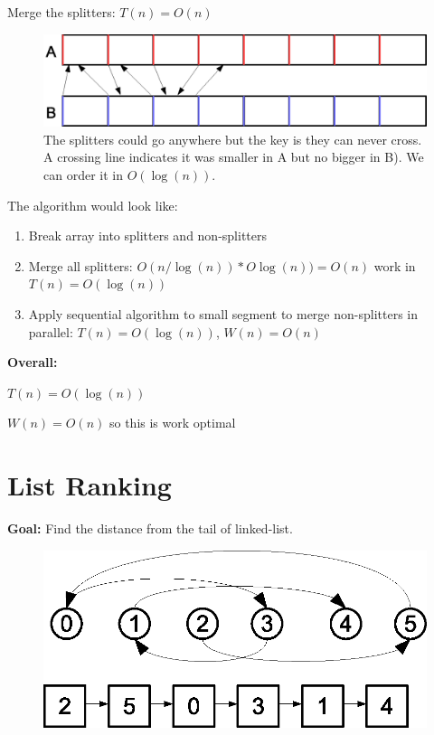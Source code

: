 \documentclass[twoside]{article}
\begin{document}
Merge the splitters: $T(n)=O(n)$
\begin{figure}[H]
\center
\includegraphics[scale=0.5]{img/merge.eps}
\caption{The splitters could go anywhere but the key is they can never cross. A crossing line indicates it was smaller in A but no bigger in B). We can order it in $O(\log(n))$.}
\end{figure}

The algorithm would look like:
\begin{enumerate}
    \item Break array into splitters and non-splitters
    \item Merge all splitters: $O(n/\log(n)) * O\log(n)) = O(n)$ work in $T(n) = O(\log(n))$
    \item Apply sequential algorithm to small segment to merge non-splitters in parallel: $T(n) = O(\log(n))$, $W(n) = O(n)$
\end{enumerate}
\textbf{Overall:}

$T(n) = O(\log(n))$

$W(n) = O(n)$ so this is work optimal

\section{List Ranking}
\textbf{Goal:} Find the distance from the tail of linked-list.

\begin{figure}[h]
\center
\includegraphics[scale=0.5]{img/linked_list.eps}
\end{figure}
\end{document}
